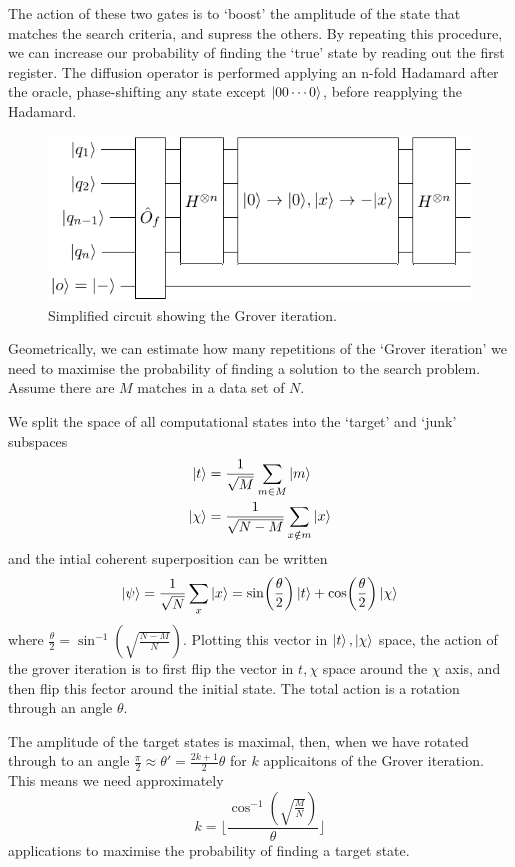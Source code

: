 \documentclass[11pt]{article}
\begin{document}
The action of these two gates is to `boost' the amplitude of the state that matches the search criteria, and supress the others. By repeating this procedure, we can increase our probability of finding the `true' state by reading out the first register. The diffusion operator is performed applying an n-fold Hadamard after the oracle, phase-shifting any state except $\ket{00\cdots 0}$, before reapplying the Hadamard.

\begin{figure}[h]
    \centering
    \includegraphics[width=.5\textwidth]{Circuits/grover.pdf}
    \caption{Simplified circuit showing the Grover iteration.}
\end{figure}

Geometrically, we can estimate how many repetitions of the `Grover iteration' we need to maximise the probability of finding a solution to the search problem. Assume there are $M$ matches in a data set of $N$.

We split the space of all computational states into the `target' and `junk' subspaces
\begin{align*}
    \ket{t} &= \frac{1}{\sqrt{M}}\sum_{m\in M}\ket{m} \\
    \ket{\chi} &= \frac{1}{\sqrt{N-M}}\sum_{x\notin m}\ket{x}
\end{align*}
and the intial coherent superposition can be written
\begin{equation}
    \ket{\psi}=\frac{1}{\sqrt{N}}\sum_{x}\ket{x} = \sin(\frac{\theta}{2})\ket{t}+\cos(\frac{\theta}{2})\ket{\chi}
\end{equation}
where $\frac{\theta}{2}=\sin^{-1}(\sqrt{\frac{N-M}{N}})$. Plotting this vector in $\ket{t},\ket{\chi}$ space, the action of the grover iteration is to first flip the vector in $t,\chi$ space around the $\chi$ axis, and then flip this fector around the initial state. The total action is a rotation through an angle $\theta$.

The amplitude of the target states is maximal, then, when we have rotated through to an angle $\frac{\pi}{2}\approx\theta'=\frac{2k+1}{2}\theta$ for $k$ applicaitons of the Grover iteration. This means we need approximately
\begin{equation}
    k=\lfloor \frac{\cos^{-1}(\sqrt{\frac{M}{N}})}{\theta} \rfloor
\end{equation}
applications to maximise the probability of finding a target state.
\end{document}
